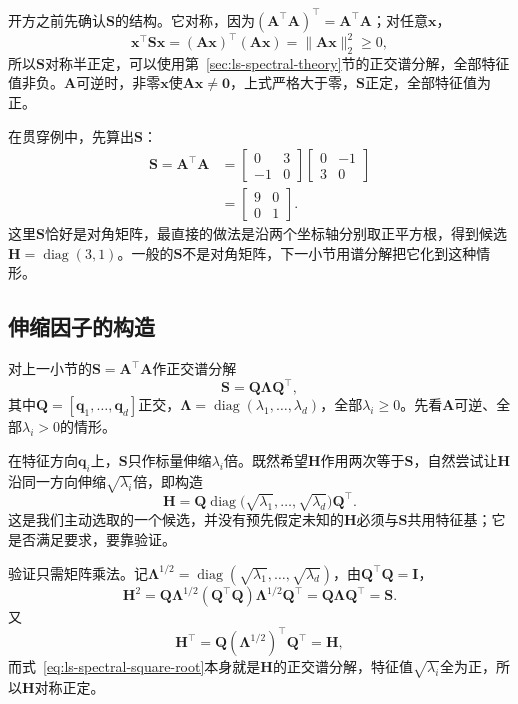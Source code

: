 开方之前先确认$\bm S$的结构。它对称，因为$(\bm A^\top\bm A)^\top=\bm A^\top\bm A$；对任意$\bm x$，
\[
 \bm x^\top\bm S\bm x=(\bm A\bm x)^\top(\bm A\bm x)=\lVert\bm A\bm x\rVert_2^2\geq0,
\]
所以$\bm S$对称半正定，可以使用第~\ref{sec:ls-spectral-theory}节的正交谱分解，全部特征值非负。$\bm A$可逆时，非零$\bm x$使$\bm A\bm x\neq\bm0$，上式严格大于零，$\bm S$正定，全部特征值为正。

在贯穿例中，先算出$\bm S$：
\[
 \begin{aligned}
 \bm S=\bm A^\top\bm A
 &=\begin{bmatrix}0&3\\-1&0\end{bmatrix}
 \begin{bmatrix}0&-1\\3&0\end{bmatrix}\\
 &=\begin{bmatrix}9&0\\0&1\end{bmatrix}.
 \end{aligned}
\]
这里$\bm S$恰好是对角矩阵，最直接的做法是沿两个坐标轴分别取正平方根，得到候选$\bm H=\operatorname{diag}(3,1)$。一般的$\bm S$不是对角矩阵，下一小节用谱分解把它化到这种情形。

\subsection{伸缩因子的构造}
\label{sec:ls-matrix-square-root}

对上一小节的$\bm S=\bm A^\top\bm A$作正交谱分解
\[
 \bm S=\bm Q\bm\Lambda\bm Q^\top,
\]
其中$\bm Q=[\bm q_1,\ldots,\bm q_d]$正交，$\bm\Lambda=\operatorname{diag}(\lambda_1,\ldots,\lambda_d)$，全部$\lambda_i\geq0$。先看$\bm A$可逆、全部$\lambda_i>0$的情形。

在特征方向$\bm q_i$上，$\bm S$只作标量伸缩$\lambda_i$倍。既然希望$\bm H$作用两次等于$\bm S$，自然尝试让$\bm H$沿同一方向伸缩$\sqrt{\lambda_i}$倍，即构造
\begin{equation}
 \bm H=\bm Q\operatorname{diag}\bigl(\sqrt{\lambda_1},\ldots,\sqrt{\lambda_d}\bigr)\bm Q^\top .
 \label{eq:ls-spectral-square-root}
\end{equation}
这是我们主动选取的一个候选，并没有预先假定未知的$\bm H$必须与$\bm S$共用特征基；它是否满足要求，要靠验证。

验证只需矩阵乘法。记$\bm\Lambda^{1/2}=\operatorname{diag}(\sqrt{\lambda_1},\ldots,\sqrt{\lambda_d})$，由$\bm Q^\top\bm Q=\bm I$，
\[
 \bm H^2
 =\bm Q\bm\Lambda^{1/2}(\bm Q^\top\bm Q)\bm\Lambda^{1/2}\bm Q^\top
 =\bm Q\bm\Lambda\bm Q^\top
 =\bm S .
\]
又
\[
 \bm H^\top=\bm Q(\bm\Lambda^{1/2})^\top\bm Q^\top=\bm H ,
\]
而式~\eqref{eq:ls-spectral-square-root}本身就是$\bm H$的正交谱分解，特征值$\sqrt{\lambda_i}$全为正，所以$\bm H$对称正定。

